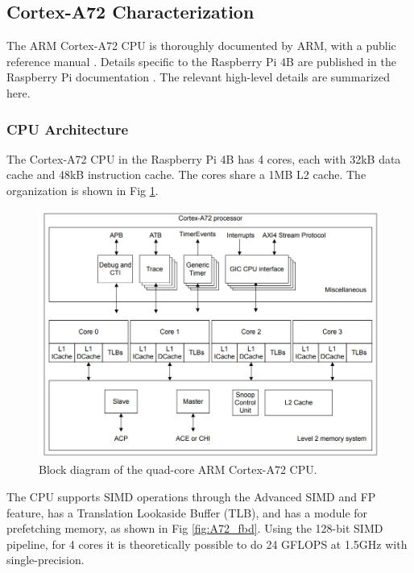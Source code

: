 \documentclass[12pt]{article}
\begin{document}
\subsection{Cortex-A72 Characterization}

The ARM Cortex-A72 CPU is thoroughly documented by ARM, with a public reference manual \cite{ARM2021}. Details specific to the Raspberry Pi 4B are published in the Raspberry Pi documentation \cite{raspberrypi2024}. The relevant high-level details are summarized here.

\subsubsection{CPU Architecture}

The Cortex-A72 CPU in the Raspberry Pi 4B has 4 cores, each with 32kB data cache and 48kB instruction cache. The cores share a 1MB L2 cache. The organization is shown in Fig \ref{fig:A72_arch}.

\begin{figure}[h]
\centering
\includegraphics[width=1.0\textwidth]{A72_Core_Diagram.png} %
\caption{Block diagram of the quad-core ARM Cortex-A72 CPU.}
\label{fig:A72_arch}
\end{figure}

The CPU supports SIMD operations through the Advanced SIMD and FP feature, has a Translation Lookaside Buffer (TLB), and has a module for prefetching memory, as shown in Fig \ref{fig:A72_fbd}. Using the 128-bit SIMD pipeline, for 4 cores it is theoretically possible to do 24 GFLOPS at 1.5GHz with single-precision.
\end{document}
